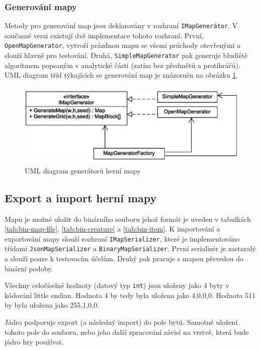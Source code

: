\documentclass[11pt,a4paper]{scrartcl}
\begin{document}
	
	
	\subsubsection{Generování mapy}
	Metody pro generování map jsou deklarovány v rozhraní \verb|IMapGenerátor|. V současné verzi existují dvě implementace tohoto rozhraní. První, \verb|OpenMapGenerator|, vytvoří prázdnou mapu se všemi průchody otevřenými a slouží hlavně pro testování. Druhá, \verb|SimpleMapGenerator| pak generuje bludiště algoritmem popsaným v analytické části (zatím bez předmětů a protihráčů). UML diagram tříd týkajících se generování map je znázorněn na obrázku \ref{fig:core-map-generator}.
	
	\begin{figure}[H]
		\centering
		\includegraphics[height=40mm]{core-map-generator-simple}
		\caption{UML diagram generátorů herní mapy}
		\label{fig:core-map-generator}
	\end{figure}
	
	\subsection{Export a import herní mapy}
	Mapu je možné uložit do binárního souboru jehož formát je uveden v tabulkách \ref{tab:bin-map-file}, \ref{tab:bin-creature} a \ref{tab:bin-item}. K importování a exportování mapy slouží rozhraní \verb|IMapSerializer|, které je implementováno třídami \verb|JsonMapSerializer| a \verb|BinaryMapSerializer|. První serializér je zastaralý a slouží pouze k testovacím účelům. Druhý pak pracuje s mapou převedou do binární podoby.
	
	Všechny celočíselné hodnoty (datový typ \verb|int|) jsou uloženy jako 4 byty v kódování little endian. Hodnota 4 by tedy byla uložena jako 4,0,0,0. Hodnota 511 by byla uložena jako 255,1,0,0.
	
	Jádro podporuje export (a následný import) do pole bytů. Samotné uložení tohoto pole do souboru, nebo jeho další zpracování závisí na vrstvě, která bude jádro hry používat.
	
\end{document}
